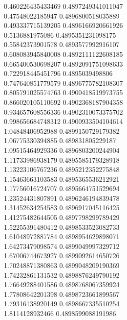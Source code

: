 {0.460226435433469 0.4897249341011047 \\
0.47548022185947 0.4896800518035889 \\
0.493337715139205 0.4896166920661926 \\
0.5136881975086 0.4895351231098175 \\
0.55842373901578 0.4893577992916107 \\
0.608083945840008 0.4892111122608185 \\
0.665400530698207 0.4892091751098633 \\
0.722918445451796 0.4895039498806 \\
0.747640851779579 0.4896775782108307 \\
0.805791025574763 0.4900418519973755 \\
0.866020105110692 0.4902368187904358 \\
0.934657608556336 0.4902310073375702 \\
0.998656684748312 0.4900933504104614 \\
1.04848406952988 0.4899150729179382 \\
1.06775330394885 0.489831805229187 \\
1.09515464929336 0.4896803200244904 \\
1.11733986938179 0.4895585179328918 \\
1.13223106767236 0.4895212352275848 \\
1.15463663103583 0.4895365536212921 \\
1.17756016724707 0.4895664751529694 \\
1.23524431807891 0.4896246194839478 \\
1.31452634254583 0.4896917045116425 \\
1.41275482644505 0.4897798299789429 \\
1.52255391480412 0.4898533523082733 \\
1.61048972887784 0.4898954629898071 \\
1.64273479098574 0.4899049997329712 \\
1.67006744673927 0.4899092614650726 \\
1.70248871380863 0.4899048209190369 \\
1.74232861131532 0.4898876249790192 \\
1.76649288401586 0.4898768067359924 \\
1.77808642201398 0.4898723661899567 \\
1.79316138920149 0.4898667335510254 \\
1.8114128932466 0.4898599088191986 \\
}
